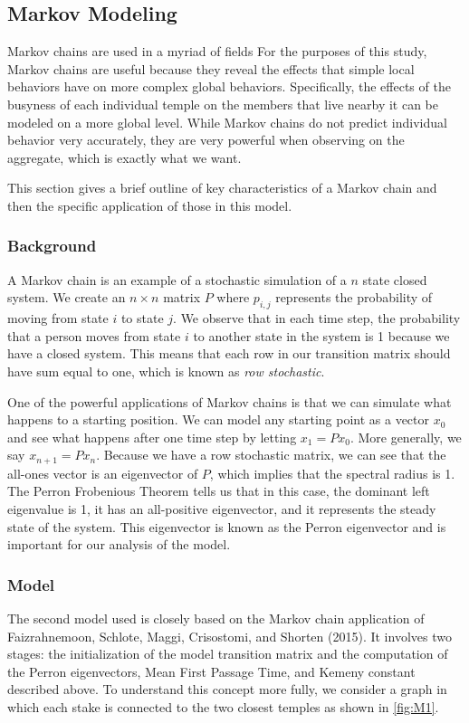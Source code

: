 \documentclass[twoside,twocolumn]{article}
\begin{document}
\subsection{Markov Modeling}

Markov chains are used in a myriad of fields
 For the purposes of this study, Markov chains are useful because they reveal the effects that simple local behaviors have on more complex global behaviors.
Specifically, the effects of the busyness of each individual temple on the members that live nearby it can be modeled on a more global level.
While Markov chains do not predict individual behavior very accurately, they are very powerful when observing on the aggregate, which is exactly what we want.

This section gives a brief outline of key characteristics of a Markov chain and then the specific application of those in this model.

\subsubsection{Background}

A Markov chain is an example of a stochastic simulation of a $n$ state closed system.
We create an $n\times n$ matrix $P$ where $p_{i,j}$ represents the probability of moving from state $i$ to state $j$.
We observe that in each time step, the probability that a person moves from state $i$ to another state in the system is 1 because we have a closed system.
This means that each row in our transition matrix should have sum equal to one, which is known as {\em row stochastic}.

One of the powerful applications of Markov chains is that we can simulate what happens to a starting position.
We can model any starting point as a vector $x_0$ and see what happens after one time step by letting $x_1 = P x_0$.
More generally, we say $x_{n + 1} = P x_n$.
Because we have a row stochastic matrix, we can see that the all-ones vector is an eigenvector of $P$, which implies that the spectral radius is 1. %
The Perron Frobenious Theorem tells us that in this case, the dominant left eigenvalue is 1, it has an all-positive eigenvector, and it represents the steady state of the system.
This eigenvector is known as the Perron eigenvector and is important for our analysis of the model.

\subsubsection{Model}
The second model used is closely based on the Markov chain application of Faizrahnemoon, Schlote, Maggi, Crisostomi, and Shorten (2015).
It involves two stages: the initialization of the model transition matrix and the computation of the Perron eigenvectors, Mean First Passage Time, and Kemeny constant described above.
To understand this concept more fully, we consider a graph in which each stake is connected to the two closest temples as shown in \ref{fig:M1}.\newline
\end{document}
